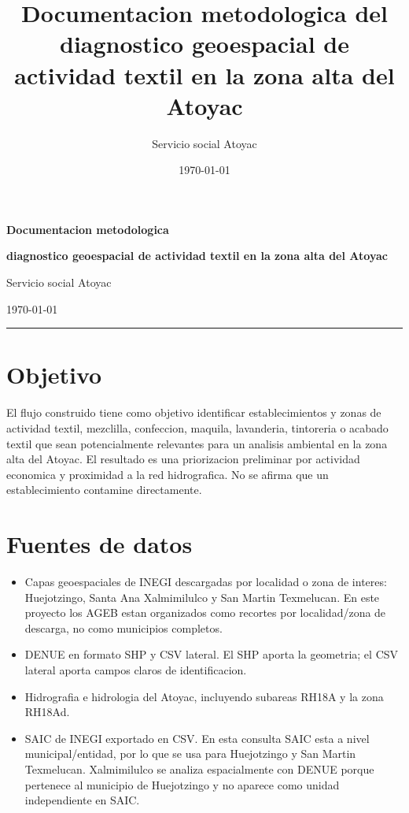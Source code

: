 \documentclass[11pt,letterpaper]{article}
\title{Documentacion metodologica del diagnostico geoespacial de actividad textil en la zona alta del Atoyac}
\author{Servicio social Atoyac}
\date{\today}
\begin{document}
{\centering
{\Huge\bfseries\color{AtoyacBlue} Documentacion metodologica\par}
{\Large\bfseries diagnostico geoespacial de actividad textil en la zona alta del Atoyac\par}
\vspace{0.8em}
{\large Servicio social Atoyac\par}
{\normalsize \today\par}
\vspace{1.2em}
}

\hrule
\vspace{1em}

\section{Objetivo}

El flujo construido tiene como objetivo identificar establecimientos y zonas de actividad textil, mezclilla, confeccion, maquila, lavanderia, tintoreria o acabado textil que sean potencialmente relevantes para un analisis ambiental en la zona alta del Atoyac. El resultado es una priorizacion preliminar por actividad economica y proximidad a la red hidrografica. No se afirma que un establecimiento contamine directamente.

\section{Fuentes de datos}

\begin{itemize}
  \item Capas geoespaciales de INEGI descargadas por localidad o zona de interes: Huejotzingo, Santa Ana Xalmimilulco y San Martin Texmelucan. En este proyecto los AGEB estan organizados como recortes por localidad/zona de descarga, no como municipios completos.
  \item DENUE en formato SHP y CSV lateral. El SHP aporta la geometria; el CSV lateral aporta campos claros de identificacion.
  \item Hidrografia e hidrologia del Atoyac, incluyendo subareas RH18A y la zona RH18Ad.
  \item SAIC de INEGI exportado en CSV. En esta consulta SAIC esta a nivel municipal/entidad, por lo que se usa para Huejotzingo y San Martin Texmelucan. Xalmimilulco se analiza espacialmente con DENUE porque pertenece al municipio de Huejotzingo y no aparece como unidad independiente en SAIC.
\end{itemize}
\end{document}
